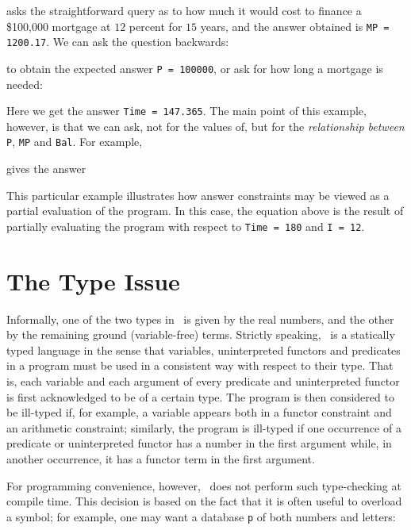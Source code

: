 \noindent
asks the straightforward query as to how much it would cost
to finance a \$100,000 mortgage at $12$ percent for $15$ years,
and the answer obtained is {\tt MP = 1200.17}.
We can ask the question backwards:


\noindent
to obtain the expected answer {\tt P = 100000}, or ask for how long
a mortgage is needed:


\noindent
Here we get the answer {\tt Time = 147.365}.
The main point of this example, however, is that we can ask,
not for the values of, but for the {\em relationship between\/}
{\tt P}, {\tt MP} and {\tt Bal}.  For example,


\noindent
gives the answer


\noindent
This particular example illustrates how
answer constraints may be viewed as a partial evaluation
of the program.  In this case, the equation above is the result of
partially evaluating the program with respect to
{\tt Time = 180} and {\tt I = 12}.

\section{The Type Issue}

Informally, one of the two types in \CLPR\ is given by the real numbers, 
and the other by the remaining ground (variable-free) terms.  
Strictly speaking, \CLPR\ is a statically typed language in the sense
that variables, uninterpreted functors and predicates in a program
must be used in a consistent way with respect to their type.
That is, each variable and each argument of 
every predicate and uninterpreted functor 
is first acknowledged to be of a certain type.
The program is then considered to be ill-typed if, for example,
a variable appears both in a functor constraint and an arithmetic
constraint; similarly, the program is ill-typed  
if one occurrence of a predicate or uninterpreted functor 
has a number in the first argument while, in another occurrence,
it has a functor term in the first argument.

For programming convenience, however, \CLPR\ does not perform
such type-checking at compile time.  This decision is based on
the fact that it is often useful to overload a symbol; for example,
one may want a database {\tt p} of both numbers and letters:

